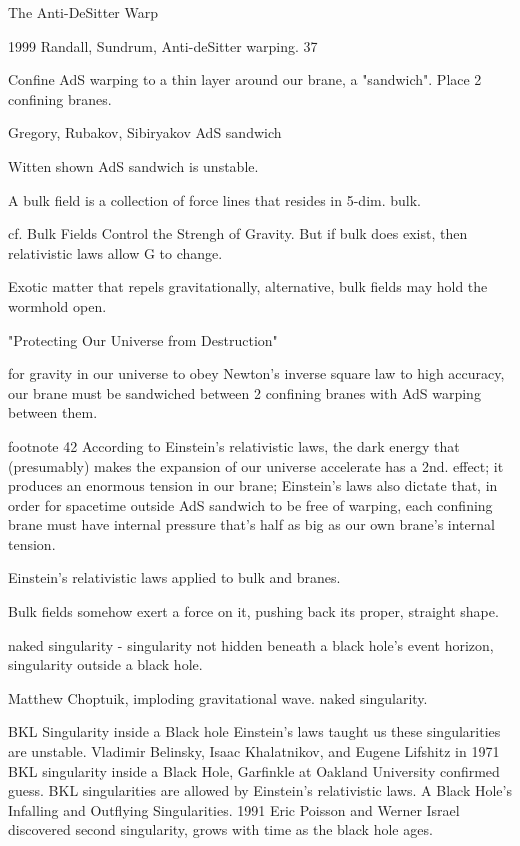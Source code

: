 \documentclass[10pt]{amsart}
\begin{document}
The Anti-DeSitter Warp

1999 Randall, Sundrum, Anti-deSitter warping. 37

Confine AdS warping to a thin layer around our brane, a "sandwich". Place 2 confining branes. 

Gregory, Rubakov, Sibiryakov AdS sandwich

Witten shown AdS sandwich is unstable.

A bulk field is a collection of force lines that resides in 5-dim. bulk.

cf. Bulk Fields Control the Strengh of Gravity. But if bulk does exist, then relativistic laws allow G to change.

Exotic matter that repels gravitationally,
alternative, bulk fields may hold the wormhold open.

"Protecting Our Universe from Destruction"

for gravity in our universe to obey Newton's inverse square law to high accuracy, our brane must be sandwiched between 2 confining branes with AdS warping between them.

footnote 42 
According to Einstein's relativistic laws, the dark energy that (presumably) makes the expansion of our universe accelerate has a 2nd. effect; it produces an enormous tension in our brane; Einstein's laws also dictate that, in order for spacetime outside AdS sandwich to be free of warping, each confining brane must have internal pressure that's half as big as our own brane's internal tension.

Einstein's relativistic laws applied to bulk and branes.

Bulk fields somehow exert a force on it, pushing back its proper, straight shape.

naked singularity - singularity not hidden beneath a black hole's event horizon, singularity outside a black hole.

Matthew Choptuik, imploding gravitational wave. naked singularity.

BKL Singularity inside a Black hole
Einstein's laws taught us these singularities are unstable. Vladimir Belinsky, Isaac Khalatnikov, and Eugene Lifshitz in 1971 BKL singularity inside a Black Hole, Garfinkle at Oakland University confirmed guess. 
BKL singularities are allowed by Einstein's relativistic laws.
A Black Hole's Infalling and Outflying Singularities.
1991 Eric Poisson and Werner Israel discovered second singularity, grows with time as the black hole ages.
\end{document}
